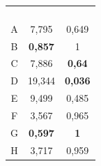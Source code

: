 \begin{table}[!htb]
\begin{subtable}{0.45\linewidth}
\begin{tabular}{@{}ccc@{}}
			& & \\
			& & \\
			& & \\
			& & \\ \midrule
			A & 7,795 & 0,649 \\
			B & \textbf{0,857} & 1 \\
			C & 7,886 & \textbf{0,64} \\
			D & 19,344 & \textbf{0,036} \\
			E & 9,499 & 0,485 \\
			F & 3,567 & 0,965 \\
			G & \textbf{0,597} & \textbf{1} \\
			H & 3,717 & 0,959 \\ \bottomrule
		\end{tabular}
	\end{subtable}
	
	\vspace{1em}
	

\end{table}
